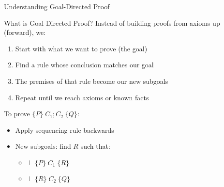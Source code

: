 \begin{frame}{Understanding Goal-Directed Proof}
    \begin{block}{What is Goal-Directed Proof?}
        Instead of building proofs from axioms up (forward), we:
        \begin{enumerate}
            \item Start with what we want to prove (the goal)
            \item Find a rule whose conclusion matches our goal
            \item The premises of that rule become our new subgoals
            \item Repeat until we reach axioms or known facts
        \end{enumerate}
    \end{block}
    
    \begin{example}
        To prove $\{P\} \; C_1; C_2 \; \{Q\}$:
        \begin{itemize}
            \item Apply sequencing rule backwards
            \item New subgoals: find $R$ such that:
                \begin{itemize}
                    \item $\vdash \{P\} \; C_1 \; \{R\}$
                    \item $\vdash \{R\} \; C_2 \; \{Q\}$
                \end{itemize}
        \end{itemize}
    \end{example}
\end{frame}

